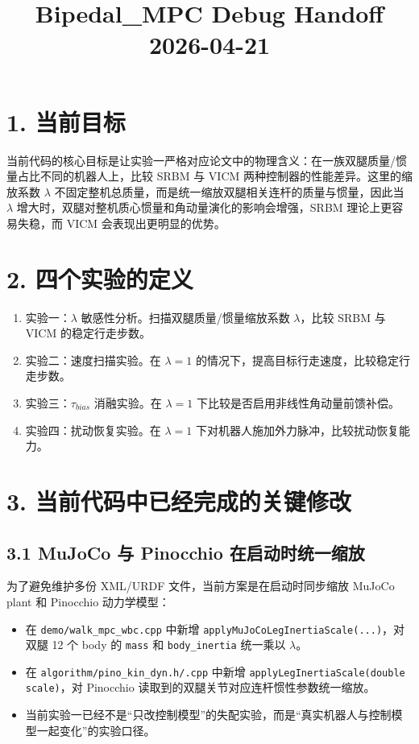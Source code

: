 \documentclass[11pt]{ctexart}
\title{Bipedal\_MPC Debug Handoff\\2026-04-21}
\author{}
\date{}
\begin{document}
\maketitle

\section*{1. 当前目标}
当前代码的核心目标是让实验一严格对应论文中的物理含义：在一族双腿质量/惯量占比不同的机器人上，比较 SRBM 与 VICM 两种控制器的性能差异。这里的缩放系数 $\lambda$ 不固定整机总质量，而是统一缩放双腿相关连杆的质量与惯量，因此当 $\lambda$ 增大时，双腿对整机质心惯量和角动量演化的影响会增强，SRBM 理论上更容易失稳，而 VICM 会表现出更明显的优势。

\section*{2. 四个实验的定义}
\begin{enumerate}
  \item 实验一：$\lambda$ 敏感性分析。扫描双腿质量/惯量缩放系数 $\lambda$，比较 SRBM 与 VICM 的稳定行走步数。
  \item 实验二：速度扫描实验。在 $\lambda = 1$ 的情况下，提高目标行走速度，比较稳定行走步数。
  \item 实验三：$\tau_{bias}$ 消融实验。在 $\lambda = 1$ 下比较是否启用非线性角动量前馈补偿。
  \item 实验四：扰动恢复实验。在 $\lambda = 1$ 下对机器人施加外力脉冲，比较扰动恢复能力。
\end{enumerate}

\section*{3. 当前代码中已经完成的关键修改}
\subsection*{3.1 MuJoCo 与 Pinocchio 在启动时统一缩放}
为了避免维护多份 XML/URDF 文件，当前方案是在启动时同步缩放 MuJoCo plant 和 Pinocchio 动力学模型：
\begin{itemize}
  \item 在 \texttt{demo/walk\_mpc\_wbc.cpp} 中新增 \texttt{applyMuJoCoLegInertiaScale(...)}，对双腿 12 个 body 的 \texttt{mass} 和 \texttt{body\_inertia} 统一乘以 $\lambda$。
  \item 在 \texttt{algorithm/pino\_kin\_dyn.h/.cpp} 中新增 \texttt{applyLegInertiaScale(double scale)}，对 Pinocchio 读取到的双腿关节对应连杆惯性参数统一缩放。
  \item 当前实验一已经不是“只改控制模型”的失配实验，而是“真实机器人与控制模型一起变化”的实验口径。
\end{itemize}
\end{document}
